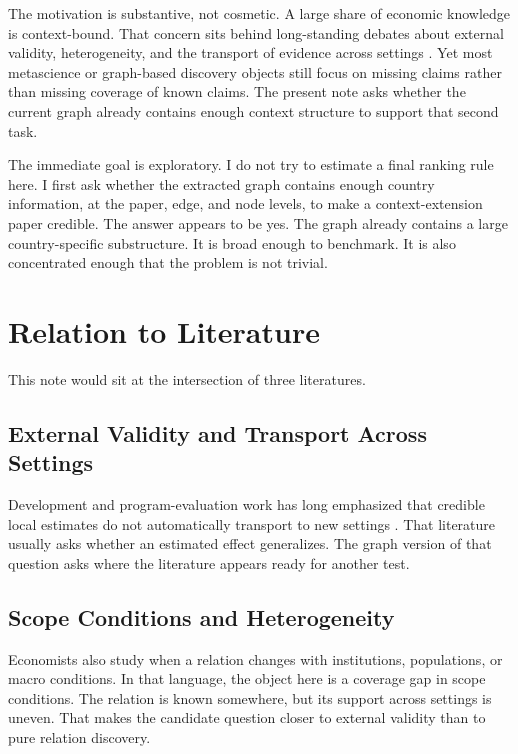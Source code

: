 \documentclass[11pt]{article}
\begin{document}
The motivation is substantive, not cosmetic. A large share of economic knowledge is context-bound. That concern sits behind long-standing debates about external validity, heterogeneity, and the transport of evidence across settings \citep{deaton2010instruments,allcott2015site,vivalt2020generalize,hotz2005predicting,bisbee2017local}. Yet most metascience or graph-based discovery objects still focus on missing claims rather than missing coverage of known claims. The present note asks whether the current graph already contains enough context structure to support that second task.

The immediate goal is exploratory. I do not try to estimate a final ranking rule here. I first ask whether the extracted graph contains enough country information, at the paper, edge, and node levels, to make a context-extension paper credible. The answer appears to be yes. The graph already contains a large country-specific substructure. It is broad enough to benchmark. It is also concentrated enough that the problem is not trivial.

\section{Relation to Literature}
This note would sit at the intersection of three literatures.

\subsection{External Validity and Transport Across Settings}
Development and program-evaluation work has long emphasized that credible local estimates do not automatically transport to new settings \citep{deaton2010instruments,allcott2015site,vivalt2020generalize,hotz2005predicting}. That literature usually asks whether an estimated effect generalizes. The graph version of that question asks where the literature appears ready for another test.

\subsection{Scope Conditions and Heterogeneity}
Economists also study when a relation changes with institutions, populations, or macro conditions. In that language, the object here is a coverage gap in scope conditions. The relation is known somewhere, but its support across settings is uneven. That makes the candidate question closer to external validity than to pure relation discovery.
\end{document}
